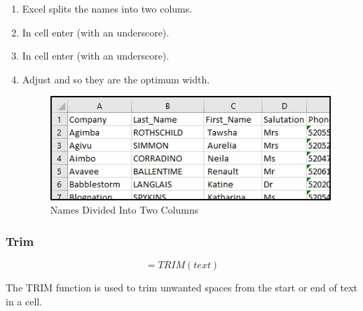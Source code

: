 \begin{enumerate}
	\item Excel splits the names into two colums. 
	\item In cell  enter  (with an underscore).
	\item In cell  enter  (with an underscore).
	\item Adjust  and  so they are the optimum width.
	
	\begin{figure}[H]
		\centering
		\includegraphics[width=\maxwidth{.95\linewidth}]{gfx/ch09_fig33}
		\caption{Names Divided Into Two Columns}
		\label{09:fig33}
	\end{figure}
\end{enumerate}

\subsubsection{Trim}

\[ =TRIM(text) \]

The TRIM function is used to trim unwanted spaces from the start or end of text in a cell.

